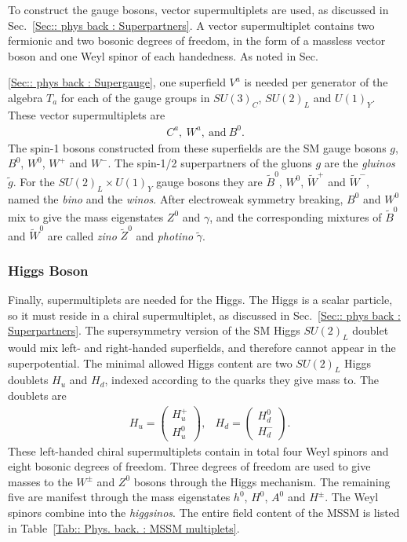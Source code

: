 \documentclass[twoside,english]{uiofysmaster}
\begin{document}
To construct the gauge bosons, vector supermultiplets are used, as discussed in Sec.~\ref{Sec:: phys back : Superpartners}. A vector supermultiplet contains two fermionic and two bosonic degrees of freedom, in the form of a massless vector boson and one Weyl spinor of each handedness. As noted in Sec.~{\ref{Sec:: phys back : Supergauge}, one superfield $V^a$ is needed per generator of the algebra $T_a$ for each of the gauge groups in $SU(3)_C$, $SU(2)_L$ and $U(1)_Y$. These vector supermultiplets are
\begin{align}
C^a, ~W^a, ~\mathrm{and}~B^0.
\end{align}
The spin-1 bosons constructed from these superfields are the SM gauge bosons $g$, $B^0$, $W^0$, $W^+$ and $W^-$. The spin-1/2 superpartners of the gluons $g$ are the \textit{gluinos} $\widetilde{g}$. For the $SU(2)_L \times U(1)_Y$ gauge bosons they are $\widetilde{B}^0$, $W^0$, $\widetilde{W}^+$ and $\widetilde{W}^-$, named the \textit{bino} and the \textit{winos}. After electroweak symmetry breaking, $B^0$ and $W^0$ mix to give the mass eigenstates $Z^0$ and $\gamma$, and the corresponding mixtures of $\widetilde{B}^0$ and $\widetilde{W}^0$ are called \textit{zino} $\widetilde{Z}^0$ and \textit{photino} $\widetilde{\gamma}$. 

\subsubsection{Higgs Boson}

Finally, supermultiplets are needed for the Higgs. The Higgs is a scalar particle, so it must reside in a chiral supermultiplet, as discussed in Sec.~\ref{Sec:: phys back : Superpartners}. The supersymmetry version of the SM Higgs $SU(2)_L$ doublet would mix left- and right-handed superfields, and therefore cannot appear in the superpotential. The minimal allowed Higgs content are two $SU(2)_L$ Higgs doublets $H_u$ and $H_d$, indexed according to the quarks they give mass to. The doublets are
\begin{align}
&H_u = \begin{pmatrix}
H_u^+\\
H_u^0
\end{pmatrix},
&H_d = \begin{pmatrix}
H_d^0\\
H_d^-
\end{pmatrix}.
\end{align}
These left-handed chiral supermultiplets contain in total four Weyl spinors and eight bosonic degrees of freedom. Three degrees of freedom are used to give masses to the $W^{\pm}$ and $Z^0$ bosons through the Higgs mechanism. The remaining five are manifest through the mass eigenstates $h^0$, $H^0$, $A^0$ and $H^{\pm}$. The Weyl spinors combine into the \textit{higgsinos}. The entire field content of the MSSM is listed in Table~\ref{Tab:: Phys. back. : MSSM multiplets}.

}
\end{document}
